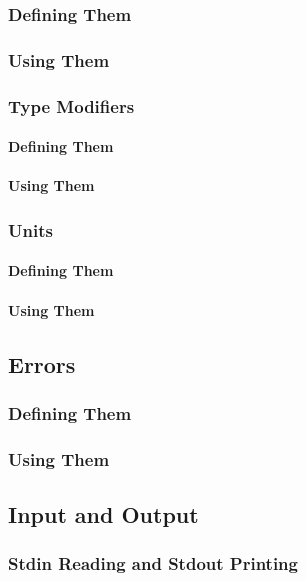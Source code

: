 \documentclass{article}
\begin{document}
\subsubsection{Defining Them}

\subsubsection{Using Them}

\subsubsection{Type Modifiers}	\label{sssec:TypeModifiers}
\paragraph{Defining Them}

\paragraph{Using Them}

\subsubsection{Units}
\paragraph{Defining Them}

\paragraph{Using Them}

\subsection{Errors}
\subsubsection{Defining Them}

\subsubsection{Using Them}

\subsection{Input and Output}
\subsubsection{Stdin Reading and Stdout Printing}
\end{document}
